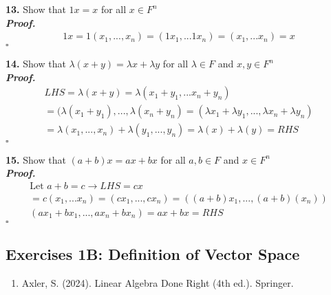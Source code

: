 \documentclass[12pt]{article} %
\newenvironment{solution}[1][\it{Proof}]{\textbf{#1. } }{$\square$}
\begin{document}
\textbf{13.} Show that $1x = x$ for all $x \in F^n$ \\

\begin{solution}
\begin{align*}
    & 1x = 1(x_1,...,x_n) = (1x_1,...1x_n) = (x_1,...x_n) = x &
\end{align*}
\end{solution}

\textbf{14.} Show that $\lambda(x+y) = \lambda x + \lambda y$ for all $\lambda \in F$ and $x,y \in F^n$ \\

\begin{solution}
\begin{align*}
    &  LHS = \lambda(x+y) = \lambda(x_1+y_1,...x_n+y_n) & \\
    & = (\lambda(x_1 +y_1), ..., \lambda(x_n+y_n) = (\lambda x_1 + \lambda y_1,...,\lambda x_n + \lambda y_n) & \\
    & = \lambda(x_1,...,x_n) + \lambda(y_1,...,y_n) = \lambda(x) + \lambda(y)  = RHS &
\end{align*}
\end{solution}

\textbf{15.} Show that $(a+b)x = ax + bx$ for all $a,b \in F$ and $x \in F^n$ \\

\begin{solution}
\begin{align*}
    & \text{Let } a+b  = c \rightarrow LHS = cx & \\
    & = c(x_1,...x_n) = (cx_1,...,cx_n) = ((a+b)x_1,...,(a+b)(x_n)) & \\
    & (ax_1 + bx_1,...,ax_n + bx_n) = ax + bx = RHS
\end{align*}
\end{solution}

\subsection*{Exercises 1B: Definition of Vector Space}




















\newpage


\begin{enumerate}
    \item Axler, S. (2024). Linear Algebra Done Right (4th ed.). Springer.
\end{enumerate}
\end{document}
